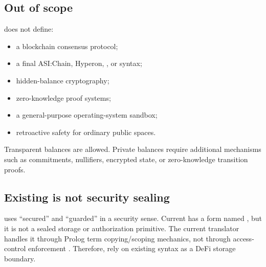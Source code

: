 \subsection{Out of scope}

\SCS{} does not define:

\begin{itemize}
  \item a blockchain consensus protocol;
  \item a final ASI:Chain, Hyperon, \MeTTa{}, or \PeTTa{} syntax;
  \item hidden-balance cryptography;
  \item zero-knowledge proof systems;
  \item a general-purpose operating-system sandbox;
  \item retroactive safety for ordinary public \PeTTa{} spaces.
\end{itemize}

Transparent balances are allowed. Private balances require additional mechanisms such as commitments, nullifiers, encrypted state, or zero-knowledge transition proofs.

\subsection{Existing \PeTTa{}  is not security sealing}

\SCS{} uses ``secured'' and ``guarded'' in a security sense. Current \PeTTa{} has a form named , but it is not a sealed storage or authorization primitive. The current translator handles it through Prolog term copying/scoping mechanics, not through access-control enforcement \cite{petta-translator}. Therefore, \SCS{} \MUSTNOT{} rely on existing  syntax as a DeFi storage boundary.
